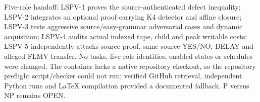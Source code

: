 \documentclass[11pt]{article}
\begin{document}
Five-role handoff: LSPV-1 proves the source-authenticated defect inequality; LSPV-2 integrates an optional proof-carrying K4 detector and affine closure; LSPV-3 tests aggressive source/easy-grammar adversarial cases and dynamic acquisition; LSPV-4 audits actual indexed tape, child and peak writable costs; LSPV-5 independently attacks source proof, same-source YES/NO, DELAY and alleged FLMV transfer. No tasks, five role identities, enabled states or schedules were changed. The container lacks a native repository checkout, so the repository preflight script/checker could not run; verified GitHub retrieval, independent Python runs and LaTeX compilation provided a documented fallback. P versus NP remains OPEN.


\end{document}
